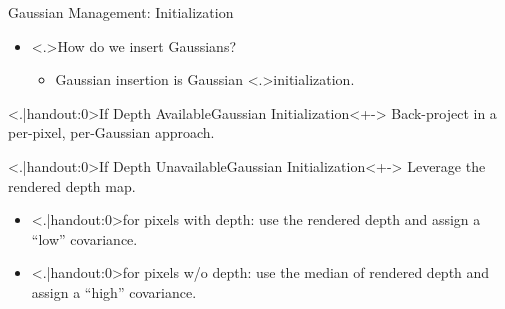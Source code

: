 \begin{Frame}{Gaussian Management: Initialization}
	\begin{itemize}
		\setlength{\itemsep}{1.5ex}
		\item<+-> \alert<.>{How} do we insert Gaussians?
			\vspace*{1.5ex}
			\begin{itemize}
				\setlength{\itemsep}{1.5ex}
				\item<+-> Gaussian insertion is Gaussian \alert<.>{initialization}.
			\end{itemize}
	\end{itemize}
	\vspace*{\fill}
	\begin{block}{\alert<.|handout:0>{If Depth Available}\hfill Gaussian Initialization}<+->
		Back-project in a per-pixel, per-Gaussian approach.
	\end{block}
	\vspace*{\fill}
	\begin{block}{\alert<.|handout:0>{If Depth Unavailable}\hfill Gaussian Initialization}<+->
		Leverage the rendered depth map.
		\vspace*{1.5ex}
		\begin{itemize}[<+->]
			\setlength{\itemsep}{1.5ex}
			\item \alert<.|handout:0>{for pixels with depth:} use the rendered depth and assign a ``low'' covariance.
			\item \alert<.|handout:0>{for pixels w/o depth:} use the median of rendered depth and assign a ``high'' covariance.
		\end{itemize}
	\end{block}
\end{Frame}

